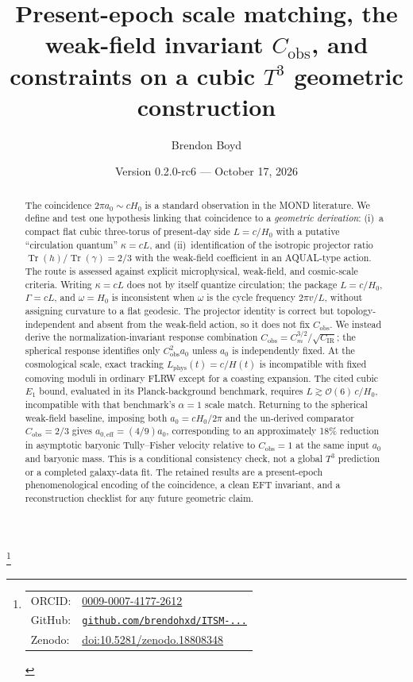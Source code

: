 \documentclass[aps,prd,reprint,superscriptaddress,nofootinbib,floatfix,showkeys]{revtex4-2}
\newcommand{\Tthree}{T^{3}}
\newcommand{\Cobs}{C_{\mathrm{obs}}}
\newcommand{\Cm}{C_{m}}
\newcommand{\CIR}{C_{\mathrm{IR}}}
\newcommand{\azero}{a_{0}}
\newcommand{\Hzero}{H_{0}}
\begin{document}
\title{Present-epoch scale matching, the weak-field invariant
\texorpdfstring{\(\Cobs\)}{C\_obs}, and constraints on a cubic
\texorpdfstring{\(\Tthree\)}{T3} geometric construction}

\author{Brendon Boyd}
\thanks{%
\begin{tabular}{@{}l@{\ }l@{}}
ORCID: & \href{https://orcid.org/0009-0007-4177-2612}{0009-0007-4177-2612} \\
GitHub: & \href{https://github.com/brendohxd/ITSM-Integrated-Toroidal-Syntropic-Model}{\texttt{github.com/brendohxd/ITSM-...}} \\
Zenodo: & \href{https://doi.org/10.5281/zenodo.18808348}{doi:10.5281/zenodo.18808348} \\
\end{tabular}%
}

\date{Version 0.2.0-rc6 --- October 17, 2026}

\begin{abstract}
The coincidence \(2\pi\azero\sim c\Hzero\) is a standard observation in the
MOND literature.  We define and test one hypothesis linking that coincidence to a
\emph{geometric derivation}: (i)~a compact flat cubic three-torus of present-day
side \(L=c/\Hzero\) with a putative ``circulation quantum'' \(\kappa=cL\), and
(ii)~identification of the isotropic projector ratio
\(\operatorname{Tr}(h)/\operatorname{Tr}(\gamma)=2/3\) with the weak-field
coefficient in an AQUAL-type action.  The route is assessed against explicit
microphysical, weak-field, and cosmic-scale criteria.  Writing \(\kappa=cL\)
does not by itself quantize circulation; the package \(L=c/\Hzero\),
\(\Gamma=cL\), and \(\omega=\Hzero\) is inconsistent when \(\omega\) is the
cycle frequency \(2\pi v/L\), without assigning curvature to a flat geodesic.
The projector identity is correct but
topology-independent and absent from the weak-field action, so it does not fix
\(\Cobs\).  We instead derive the normalization-invariant response combination
\(\Cobs=\Cm^{3/2}/\sqrt{\CIR}\); the spherical response identifies only
\(\Cobs^2\azero\) unless \(\azero\) is independently fixed.
At the cosmological scale, exact tracking \(L_{\mathrm{phys}}(t)=c/H(t)\) is
incompatible with fixed comoving moduli in ordinary FLRW except for a
coasting expansion.  The cited cubic \(E_1\) bound, evaluated in its
Planck-background benchmark, requires \(L\gtrsim\mathcal{O}(6)\,c/\Hzero\),
incompatible with that benchmark's \(\alpha=1\) scale match.
Returning to the spherical weak-field baseline, imposing
both \(\azero=c\Hzero/2\pi\) and the un-derived comparator \(\Cobs=2/3\)
gives \(a_{0,\mathrm{eff}}=(4/9)\azero\), corresponding to an approximately
18\% reduction in asymptotic baryonic Tully--Fisher velocity relative to
\(\Cobs=1\) at the same input \(\azero\) and baryonic mass. This
is a conditional consistency check, not a global \(\Tthree\) prediction or a
completed galaxy-data fit.  The retained results are a present-epoch
phenomenological encoding of the coincidence, a clean EFT invariant, and a
reconstruction checklist for any future geometric claim.
\end{abstract}
\end{document}
